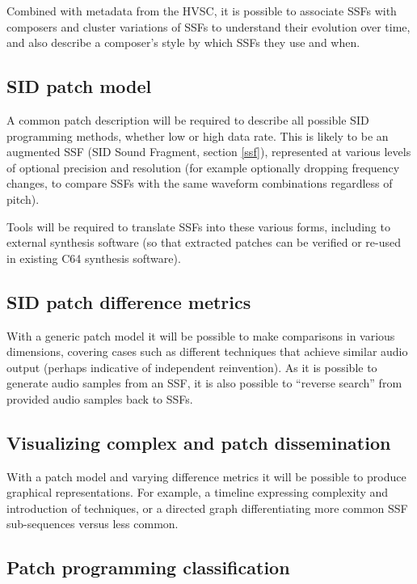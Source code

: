 \documentclass[10pt]{article}
\begin{document}
\begin{multicols*}{2}
Combined with metadata from the HVSC, it is possible to associate SSFs with composers and cluster variations of SSFs to understand their evolution over time, and also describe a composer's style by which SSFs they use and when.

\subsection{SID patch model}

A common patch description will be required to describe all possible SID programming methods, whether low or high data rate. This is likely to be an augmented SSF (SID Sound Fragment, section \ref{ssf}), represented at various levels of optional precision and resolution (for example optionally dropping frequency changes, to compare SSFs with the same waveform combinations regardless of pitch).

Tools will be required to translate SSFs into these various forms, including to external synthesis software (so that extracted patches can be verified or re-used in existing C64 synthesis software).

\subsection{SID patch difference metrics}

With a generic patch model it will be possible to make comparisons in various dimensions, covering cases such as different techniques that achieve similar audio output (perhaps indicative of independent reinvention). As it is possible to generate audio samples from an SSF, it is also possible to “reverse search” from provided audio samples back to SSFs.

\subsection{Visualizing complex and patch dissemination}

With a patch model and varying difference metrics it will be possible to produce graphical representations. For example, a timeline expressing complexity and introduction of techniques, or a directed graph differentiating more common SSF sub-sequences versus less common.

\subsection{Patch programming classification}


\end{multicols*}
\end{document}
